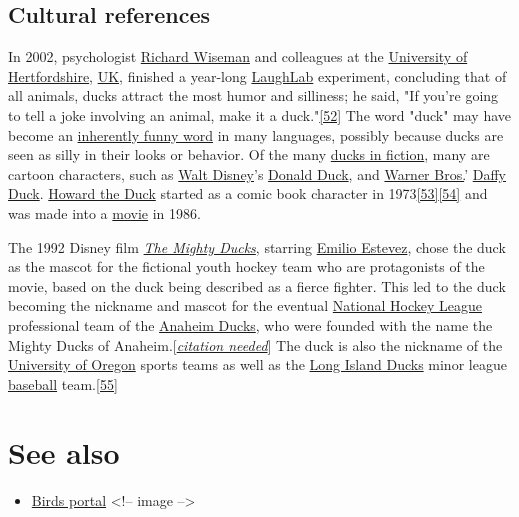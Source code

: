 \documentclass[11pt,a4paper]{article}
\begin{document}
\subsection{Cultural references}

In 2002, psychologist \href{/wiki/Richard\_Wiseman}{Richard Wiseman} and colleagues at the \href{/wiki/University\_of\_Hertfordshire}{University of Hertfordshire}, \href{/wiki/UK}{UK}, finished a year-long \href{/wiki/LaughLab}{LaughLab} experiment, concluding that of all animals, ducks attract the most humor and silliness; he said, "If you're going to tell a joke involving an animal, make it a duck."\href{\#cite\_note-52}{[52]} The word "duck" may have become an \href{/wiki/Inherently\_funny\_word}{inherently funny word} in many languages, possibly because ducks are seen as silly in their looks or behavior. Of the many \href{/wiki/List\_of\_fictional\_ducks}{ducks in fiction}, many are cartoon characters, such as \href{/wiki/The\_Walt\_Disney\_Company}{Walt Disney}'s \href{/wiki/Donald\_Duck}{Donald Duck}, and \href{/wiki/Warner\_Bros.}{Warner Bros.}' \href{/wiki/Daffy\_Duck}{Daffy Duck}. \href{/wiki/Howard\_the\_Duck}{Howard the Duck} started as a comic book character in 1973\href{\#cite\_note-53}{[53]}\href{\#cite\_note-54}{[54]} and was made into a \href{/wiki/Howard\_the\_Duck\_\%28film\%29}{movie} in 1986.

The 1992 Disney film \href{/wiki/The\_Mighty\_Ducks\_\%28film\%29}{\textit{The Mighty Ducks}}, starring \href{/wiki/Emilio\_Estevez}{Emilio Estevez}, chose the duck as the mascot for the fictional youth hockey team who are protagonists of the movie, based on the duck being described as a fierce fighter. This led to the duck becoming the nickname and mascot for the eventual \href{/wiki/National\_Hockey\_League}{National Hockey League} professional team of the \href{/wiki/Anaheim\_Ducks}{Anaheim Ducks}, who were founded with the name the Mighty Ducks of Anaheim.[\href{/wiki/Wikipedia:Citation\_needed}{\textit{citation needed}}] The duck is also the nickname of the \href{/wiki/University\_of\_Oregon}{University of Oregon} sports teams as well as the \href{/wiki/Long\_Island\_Ducks}{Long Island Ducks} minor league \href{/wiki/Baseball}{baseball} team.\href{\#cite\_note-55}{[55]}

\section{See also}

\begin{itemize}
\item \href{/wiki/Portal:Birds}{Birds portal}
<!-- image -->
\end{itemize}
\end{document}
